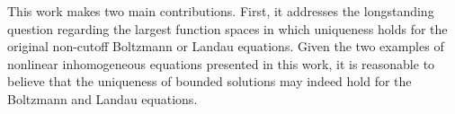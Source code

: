 \documentclass[11pt,american, reqno]{amsart}
\numberwithin{equation}{section}
\newcommand{\N}{\mathbb N}
\newcommand{\R}{\mathbb R}
\newcommand{\1}{\mathds{1}}
\newcommand{\CalM}{\mathcal{M}}
\newcommand{\vint}[1]{\left\langle#1\right\rangle}
\numberwithin{equation}{section}
\begin{document}






This work makes two main contributions. First, it addresses the longstanding question regarding the largest function spaces in which uniqueness holds for the original non-cutoff Boltzmann or Landau equations. Given the two examples of nonlinear inhomogeneous equations presented in this work, it is reasonable to believe that the uniqueness of bounded solutions may indeed hold for the Boltzmann and Landau equations.
\end{document}
